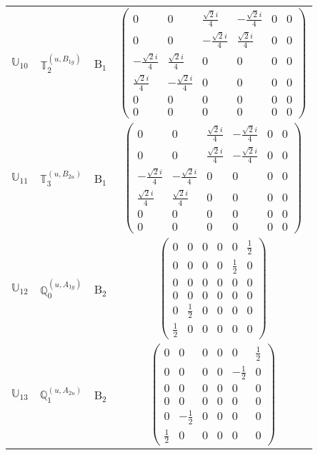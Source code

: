 \documentclass[fleqn,10pt,landscape]{article}
\begin{document}
\begin{itemize}
\begin{center}
\begin{longtable}{c|c|c|c}
$ \mathbb{U}_{10} $ & $\mathbb{T}_{2}^{(u,B_{1g})}$ & B$_{1}$ & $\begin{pmatrix} 0 & 0 & \frac{\sqrt{2} i}{4} & - \frac{\sqrt{2} i}{4} & 0 & 0 \\ 0 & 0 & - \frac{\sqrt{2} i}{4} & \frac{\sqrt{2} i}{4} & 0 & 0 \\ - \frac{\sqrt{2} i}{4} & \frac{\sqrt{2} i}{4} & 0 & 0 & 0 & 0 \\ \frac{\sqrt{2} i}{4} & - \frac{\sqrt{2} i}{4} & 0 & 0 & 0 & 0 \\ 0 & 0 & 0 & 0 & 0 & 0 \\ 0 & 0 & 0 & 0 & 0 & 0 \end{pmatrix}$ \\
$ \mathbb{U}_{11} $ & $\mathbb{T}_{3}^{(u,B_{2u})}$ & B$_{1}$ & $\begin{pmatrix} 0 & 0 & \frac{\sqrt{2} i}{4} & - \frac{\sqrt{2} i}{4} & 0 & 0 \\ 0 & 0 & \frac{\sqrt{2} i}{4} & - \frac{\sqrt{2} i}{4} & 0 & 0 \\ - \frac{\sqrt{2} i}{4} & - \frac{\sqrt{2} i}{4} & 0 & 0 & 0 & 0 \\ \frac{\sqrt{2} i}{4} & \frac{\sqrt{2} i}{4} & 0 & 0 & 0 & 0 \\ 0 & 0 & 0 & 0 & 0 & 0 \\ 0 & 0 & 0 & 0 & 0 & 0 \end{pmatrix}$ \\ \hline
$ \mathbb{U}_{12} $ & $\mathbb{Q}_{0}^{(u,A_{1g})}$ & B$_{2}$ & $\begin{pmatrix} 0 & 0 & 0 & 0 & 0 & \frac{1}{2} \\ 0 & 0 & 0 & 0 & \frac{1}{2} & 0 \\ 0 & 0 & 0 & 0 & 0 & 0 \\ 0 & 0 & 0 & 0 & 0 & 0 \\ 0 & \frac{1}{2} & 0 & 0 & 0 & 0 \\ \frac{1}{2} & 0 & 0 & 0 & 0 & 0 \end{pmatrix}$ \\
$ \mathbb{U}_{13} $ & $\mathbb{Q}_{1}^{(u,A_{2u})}$ & B$_{2}$ & $\begin{pmatrix} 0 & 0 & 0 & 0 & 0 & \frac{1}{2} \\ 0 & 0 & 0 & 0 & - \frac{1}{2} & 0 \\ 0 & 0 & 0 & 0 & 0 & 0 \\ 0 & 0 & 0 & 0 & 0 & 0 \\ 0 & - \frac{1}{2} & 0 & 0 & 0 & 0 \\ \frac{1}{2} & 0 & 0 & 0 & 0 & 0 \end{pmatrix}$ \\

\end{longtable}
\end{center}
\end{itemize}
\end{document}
